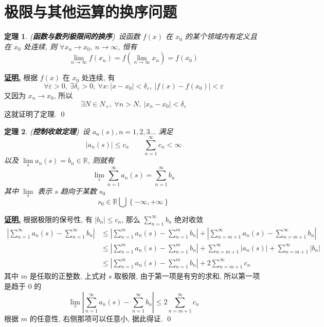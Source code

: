 \documentclass[10pt,a4paper]{book}
\theoremstyle{thmstyle} %
\newtheorem{theorem}{定理}[chapter]
\theoremstyle{defstyle} %
\theoremstyle{prostyle} %
\renewenvironment{proof}[1][证明]{\par{\kaishu \uline{\textbf{#1.}}} \;\fangsong}{\qed\par}
\begin{document}
	\section{极限与其他运算的换序问题}
	\begin{theorem}
		(\textbf{函数与数列极限间的换序})\ 设函数 $f(x)$ 在 $x_0$ 的某个领域内有定义且在 $x_0$ 处连续, 则 $\forall x_n \rightarrow x_0,\ n\rightarrow\infty$, 恒有
		$$
		\lim_{n\rightarrow \infty} f\left( x_n \right) =f\left( \lim_{n\rightarrow \infty} x_n \right) =f\left( x_0 \right) 
		$$
	\end{theorem}
	\begin{proof}
		根据 $f(x)$ 在 $x_0$ 处连续, 有
		$$
		\forall \varepsilon >0,\ \exists \delta _{\varepsilon}>0,\ \forall x:|x-x_0|<\delta _{\varepsilon},\ |f\left( x \right) -f\left( x_0 \right) |<\varepsilon 
		$$
		又因为 $x_n\rightarrow x_0$, 所以
		$$
		\exists N\in N_+,\ \forall n>N,\ |x_n-x_0|<\delta _{\varepsilon}
		$$
		这就证明了定理.
	\end{proof}
	\begin{theorem}
		(\textbf{控制收敛定理})\ 设 $a_n(s), n=1,2,3...$ 满足
		$$
		|a_n(s)|\leqslant c_n\qquad \sum_{n=1}^{\infty}{c_n<}\infty 
		$$
		以及 $\lim\limits_s a_n(s)=b_n\in \mathbb{R}$, 则就有
		$$
		\lim_s \sum_{n=1}^{\infty}{a_n(s)=\sum_{n=1}^{\infty}{b_n}}
		$$
		其中 $\lim\limits_s$ 表示 $s$ 趋向于某数 $s_0$
		$$
		s_0\in \mathbb{R} \bigcup{\left\{ -\infty ,+\infty \right\}}
		$$
	\end{theorem}
	\begin{proof}
		根据极限的保号性, 有 $|b_n|\leqslant c_n$, 那么 $\displaystyle\sum_{n=1}^{\infty}b_n$ 绝对收敛
		\begin{align*}
			\left| \sum_{n=1}^{\infty}{a_n\left( s \right) -\sum_{n=1}^{\infty}{b_n}} \right|&\leqslant \left| \sum_{n=1}^m{a_n\left( s \right) -\sum_{n=1}^m{b_n}} \right|+\left| \sum_{n=m+1}^{\infty}{a_n\left( s \right) -\sum_{n=m+1}^{\infty}{b_n}} \right|\\
			&\leqslant \left| \sum_{n=1}^m{a_n(s)-\sum_{n=1}^m{b_n}} \right|+\sum_{n=m+1}^{\infty}{\left| a_n(s) \right|+\sum_{n=m+1}^{\infty}{\left| b_n \right|}}
			\\
			&\leqslant \left| \sum_{n=1}^m{a_n(s)-\sum_{n=1}^m{b_n}} \right|+2\sum_{n=m+1}^{\infty}{c_n}
		\end{align*}
		其中 $m$ 是任取的正整数, 上式对 $s$ 取极限, 由于第一项是有穷的求和, 所以第一项是趋于 0 的
		$$
		\lim_s \left| \sum_{n=1}^{\infty}{a_n(s)-\sum_{n=1}^{\infty}{b_n}} \right|\leqslant 2\sum_{n=m+1}^{\infty}{c_n}
		$$
		根据 $m$ 的任意性, 右侧那项可以任意小, 据此得证.
	\end{proof}
\end{document}
